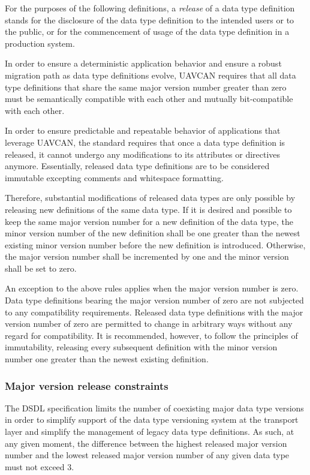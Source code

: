 For the purposes of the following definitions, a \emph{release} of a data type definition stands for
the disclosure of the data type definition to the intended users or to the public,
or for the commencement of usage of the data type definition in a production system.

In order to ensure a deterministic application behavior and ensure a robust migration path
as data type definitions evolve, UAVCAN requires that all data type definitions that share the same
major version number greater than zero must be semantically compatible with each other
and mutually bit-compatible with each other.

In order to ensure predictable and repeatable behavior of applications that leverage UAVCAN,
the standard requires that once a data type definition is released, it cannot undergo any modifications to
its attributes or directives anymore.
Essentially, released data type definitions are to be considered immutable excepting
comments and whitespace formatting.

Therefore, substantial modifications of released data types are only possible by releasing
new definitions of the same data type.
If it is desired and possible to keep the same major version number for a new definition of the data type,
the minor version number of the new definition shall be one greater than the newest existing minor version
number before the new definition is introduced.
Otherwise, the major version number shall be incremented by one and the minor version shall be set to zero.

An exception to the above rules applies when the major version number is zero.
Data type definitions bearing the major version number of zero are not subjected to any compatibility requirements.
Released data type definitions with the major version number of zero are permitted to change in arbitrary
ways without any regard for compatibility.
It is recommended, however, to follow the principles of immutability, releasing every subsequent definition
with the minor version number one greater than the newest existing definition.

\subsubsection{Major version release constraints}

The DSDL specification limits the number of coexisting major data type versions
in order to simplify support of the data type versioning system at the transport layer
and simplify the management of legacy data type definitions.
As such, at any given moment, the difference between the highest released major version number
and the lowest released major version number of any given data type must not exceed 3.

